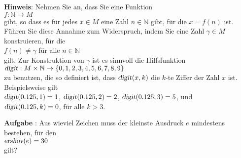 \documentclass{article}
\newcounter{aufgabe}
\newcommand{\exercise}{\vspace*{0.1cm}

\stepcounter{aufgabe}
\vspace*{0.3cm}

\noindent
\textbf{Aufgabe \arabic{aufgabe}}: }
\begin{document}
\noindent
\textbf{Hinweis}: Nehmen Sie an, dass Sie eine Funktion
\\[0.2cm]
\hspace*{1.3cm}
$f: \mathbb{N} \rightarrow M$
\\[0.2cm]
gibt, so dass es f\"ur jedes $x \in M$ eine Zahl $n \in \mathbb{N}$ gibt, f\"ur die
$x = f(n)$ ist.  F\"uhren Sie diese Annahme zum Widerspruch, indem Sie eine Zahl 
$\gamma \in M$ konstruieren, f\"ur die 
\\[0.2cm]
\hspace*{1.3cm}
$f(n) \not= \gamma$ \quad f\"ur alle $n \in \mathbb{N}$
\\[0.2cm]
gilt.  Zur Konstruktion von $\gamma$ ist es sinnvoll die Hilfsfunktion
\\[0.2cm]
\hspace*{1.3cm}
$\textsl{digit}: M \times \mathbb{N} \rightarrow \{ 0, 1, 2, 3, 4, 5, 6,7, 8, 9\}$
\\[0.2cm]
zu benutzen, die so definiert ist, dass
$\textsl{digit}(x,k)$
die $k$-te Ziffer der Zahl $x$ ist.  Beispielsweise gilt
\\[0.2cm]
\hspace*{1.3cm}
$\textsl{digit}(0.125, 1) = 1$, \quad
$\textsl{digit}(0.125, 2) = 2$, \quad
$\textsl{digit}(0.125, 3) = 5$, \quad und 
\\[0.2cm]
\hspace*{1.3cm}
$\textsl{digit}(0.125, k) = 0$, \quad f\"ur alle $k > 3$.
\pagebreak

\noindent
{}
\exercise
Aus wieviel Zeichen muss der kleinste Ausdruck $e$ mindestens bestehen, f\"ur den
\\[0.2cm]
\hspace*{1.3cm}
$\textsl{ershov}(e) = 30$
\\[0.2cm]
gilt?
\end{document}
